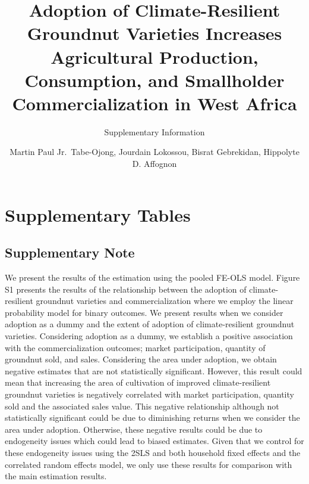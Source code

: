 \documentclass[
]{article}
\title{Adoption of Climate-Resilient Groundnut Varieties Increases Agricultural Production, Consumption, and Smallholder Commercialization in West Africa}
\subtitle{Supplementary Information}
\author{Martin Paul Jr.~Tabe-Ojong, Jourdain Lokossou, Bisrat Gebrekidan, Hippolyte D. Affognon}
\date{}
\begin{document}
\maketitle

\newpage
\tableofcontents
\newpage
\listoftables
\newpage

\newpage

\newpage

\hypertarget{supplementary-tables}{%
\section{Supplementary Tables}\label{supplementary-tables}}

\hypertarget{supplementary-note}{%
\subsection{Supplementary Note}\label{supplementary-note}}

We present the results of the estimation using the pooled FE-OLS model. Figure S1 presents the results of the relationship between the adoption of climate-resilient groundnut varieties and commercialization where we employ the linear probability model for binary outcomes. We present results when we consider adoption as a dummy and the extent of adoption of climate-resilient groundnut varieties. Considering adoption as a dummy, we establish a positive association with the commercialization outcomes; market participation, quantity of groundnut sold, and sales. Considering the area under adoption, we obtain negative estimates that are not statistically significant. However, this result could mean that increasing the area of cultivation of improved climate-resilient groundnut varieties is negatively correlated with market participation, quantity sold and the associated sales value. This negative relationship although not statistically significant could be due to diminishing returns when we consider the area under adoption. Otherwise, these negative results could be due to endogeneity issues which could lead to biased estimates. Given that we control for these endogeneity issues using the 2SLS and both household fixed effects and the correlated random effects model, we only use these results for comparison with the main estimation results.
\end{document}
